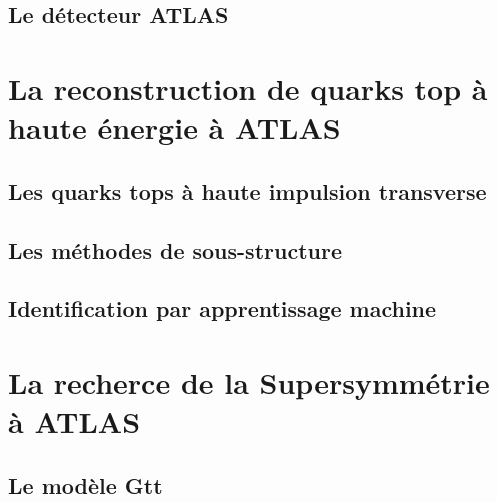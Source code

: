 \documentclass[12pt,canadien]{report}
\begin{document}
\section{Le détecteur ATLAS}
\label{sec:lhc_atlas:atlas}

\singlespacing{}
\chapter{La reconstruction de quarks top à haute énergie à ATLAS}
\label{sec:top}
\doublespacing{}

\section{Les quarks tops à haute impulsion transverse}
\label{sec:top:boosted}

\section{Les méthodes de sous-structure}
\label{sec:top:sous_structure}

\section{Identification par apprentissage machine}
\label{sec:top:ml}

\singlespacing{}
\chapter{La recherce de la Supersymmétrie à ATLAS}
\label{susy_atlas}
\doublespacing{}

\section{Le modèle Gtt}
\label{sec:susy_atlas:gtt}
\end{document}
